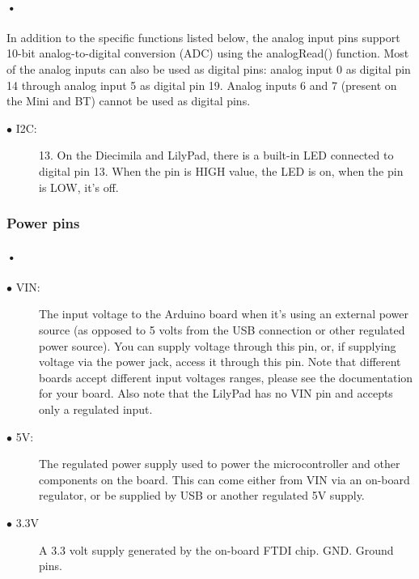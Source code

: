 \documentclass[12pt]{extarticle}
\numberwithin{figure}{section}
\begin{document}
\paragraph{•}
In addition to the specific functions listed below, the analog input pins support 10-bit analog-to-digital conversion (ADC) using the analogRead() function. Most of the analog inputs can also be used as digital pins: analog input 0 as digital pin 14 through analog input 5 as digital pin 19. Analog inputs 6 and 7 (present on the Mini and BT) cannot be used as digital pins. 
\begin{description}
\item[$\bullet$ I2C:] 13. On the Diecimila and LilyPad, there is a built-in LED connected to digital pin 13. When the pin is HIGH value, the LED is on, when the pin is LOW, it's off. 
\end{description}
\subsubsection{Power pins}
\paragraph{•}
\begin{description}
\item[$\bullet$ VIN:] The input voltage to the Arduino board when it's using an external power source (as opposed to 5 volts from the USB connection or other regulated power source). You can supply voltage through this pin, or, if supplying voltage via the power jack, access it through this pin. Note that different boards accept different input voltages ranges, please see the documentation for your board. Also note that the LilyPad has no VIN pin and accepts only a regulated input. 
\end{description}
\begin{description}
\item[$\bullet$ 5V:] The regulated power supply used to power the microcontroller and other components on the board. This can come either from VIN via an on-board regulator, or be supplied by USB or another regulated 5V supply.  
\end{description}
\begin{description}
\item[$\bullet$ 3.3V] A 3.3 volt supply generated by the on-board FTDI chip. GND. Ground pins. 
\end{description}
\end{document}
